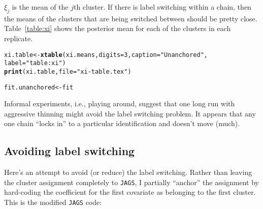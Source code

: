 \documentclass[12pt]{article}\usepackage[]{graphicx}\usepackage[]{color}
\makeatletter
\newcommand{\hlnum}[1]{\textcolor[rgb]{0.686,0.059,0.569}{#1}}%
\newcommand{\hlstr}[1]{\textcolor[rgb]{0.192,0.494,0.8}{#1}}%
\newcommand{\hlstd}[1]{\textcolor[rgb]{0.345,0.345,0.345}{#1}}%
\newcommand{\hlkwb}[1]{\textcolor[rgb]{0.69,0.353,0.396}{#1}}%
\newcommand{\hlkwc}[1]{\textcolor[rgb]{0.333,0.667,0.333}{#1}}%
\newcommand{\hlkwd}[1]{\textcolor[rgb]{0.737,0.353,0.396}{\textbf{#1}}}%
\newenvironment{kframe}{%
 \def\at@end@of@kframe{}%
 \ifinner\ifhmode%
  \def\at@end@of@kframe{\end{minipage}}%
  \begin{minipage}{\columnwidth}%
 \fi\fi%
 \def\FrameCommand##1{\hskip\@totalleftmargin \hskip-\fboxsep
 \colorbox{shadecolor}{##1}\hskip-\fboxsep
     \hskip-\linewidth \hskip-\@totalleftmargin \hskip\columnwidth}%
 \MakeFramed {\advance\hsize-\width
   \@totalleftmargin\z@ \linewidth\hsize
   \@setminipage}}%
 {\par\unskip\endMakeFramed%
 \at@end@of@kframe}
\newenvironment{knitrout}{}{} %
\makeatother
\begin{document}


$\xi_j$ is the mean of the $j$th cluster. If there is label switching
within a chain, then the means of the clusters that are being switched
between should be pretty close. Table~\ref{table:xi} shows the posterior
mean for each of the clusters in each replicate.

\begin{knitrout}
\color{fgcolor}\begin{kframe}
\begin{alltt}
\hlstd{xi.table} \hlkwb{<-} \hlkwd{xtable}\hlstd{(xi.means,} \hlkwc{digits} \hlstd{=} \hlnum{3}\hlstd{,} \hlkwc{caption} \hlstd{=} \hlstr{"Unanchored"}\hlstd{,}
  \hlkwc{label} \hlstd{=} \hlstr{"table:xi"}\hlstd{)}
\hlkwd{print}\hlstd{(xi.table,} \hlkwc{file} \hlstd{=} \hlstr{"xi-table.tex"}\hlstd{)}

\hlstd{fit.unanchored} \hlkwb{<-} \hlstd{fit}
\end{alltt}
\end{kframe}
\end{knitrout}



Informal experiments, i.e., playing around, suggest that one long run
with aggressive thinning might avoid the label switching problem. It
appears that any one chain ``locks in'' to a particular identification
and doesn't move (much).

\subsection*{Avoiding label switching}

Here's an attempt to avoid (or reduce) the label switching. Rather
than leaving the cluster assignment completely to {\tt JAGS}, I
partially ``anchor'' the assignment by hard-coding the coefficient for
the first covariate as belonging to the first cluster. This is the
modified {\tt JAGS} code:


\end{document}
